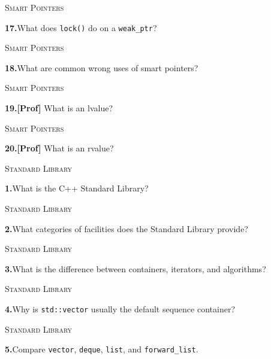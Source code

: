 \documentclass[11pt,a4paper]{article}
\newenvironment{questionblock}{%
  \begin{minipage}[t][0.455\textheight][t]{\textwidth}%
  \raggedright\small
}{%
  \vfill
  \end{minipage}%
}
\newcommand{\sectionlabel}[1]{\textsc{#1}\par\vspace{0.35em}}
\newcommand{\questionnumber}[1]{\textbf{#1.}\enspace}
\begin{document}
\vspace*{0.04\textheight}
\begin{questionblock}
\sectionlabel{Smart Pointers}
\questionnumber{17}What does \verb|lock()| do on a \verb|weak_ptr|?\par
\end{questionblock}
\newpage
\begin{questionblock}
\sectionlabel{Smart Pointers}
\questionnumber{18}What are common wrong uses of smart pointers?\par
\end{questionblock}
\vspace*{0.04\textheight}
\begin{questionblock}
\sectionlabel{Smart Pointers}
\questionnumber{19}\textbf{[Prof]} What is an lvalue?\par
\end{questionblock}
\newpage
\begin{questionblock}
\sectionlabel{Smart Pointers}
\questionnumber{20}\textbf{[Prof]} What is an rvalue?\par

\end{questionblock}
\vspace*{0.04\textheight}
\begin{questionblock}
\sectionlabel{Standard Library}
\questionnumber{1}What is the C++ Standard Library?\par
\end{questionblock}
\newpage
\begin{questionblock}
\sectionlabel{Standard Library}
\questionnumber{2}What categories of facilities does the Standard Library provide?\par
\end{questionblock}
\vspace*{0.04\textheight}
\begin{questionblock}
\sectionlabel{Standard Library}
\questionnumber{3}What is the difference between containers, iterators, and algorithms?\par
\end{questionblock}
\newpage
\begin{questionblock}
\sectionlabel{Standard Library}
\questionnumber{4}Why is \verb|std::vector| usually the default sequence container?\par
\end{questionblock}
\vspace*{0.04\textheight}
\begin{questionblock}
\sectionlabel{Standard Library}
\questionnumber{5}Compare \verb|vector|, \verb|deque|, \verb|list|, and \verb|forward_list|.\par
\end{questionblock}
\end{document}
